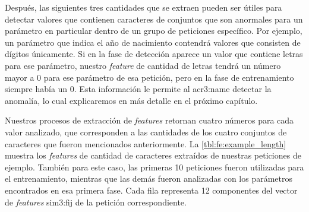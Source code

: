 Después, las siguientes tres cantidades que se extraen pueden ser útiles
para detectar valores que contienen caracteres de conjuntos que son
anormales para un parámetro en particular dentro de un grupo de peticiones
específico.
Por ejemplo, un parámetro que indica el año de nacimiento contendrá
valores que consisten de dígitos únicamente. Si en la fase de detección
aparece un valor que contiene letras para ese parámetro, nuestro
\textit{feature} de cantidad de letras tendrá un número mayor a 0 para
ese parámetro de esa petición, pero en la fase de entrenamiento siempre
había un 0. Esta información le permite al \gls{acr3:name} detectar la
anomalía, lo cual explicaremos en más detalle en el próximo capítulo.

Nuestros procesos de extracción de \textit{features} retornan cuatro
números para cada valor analizado, que corresponden a las cantidades de
los cuatro conjuntos de caracteres que fueron mencionados anteriormente.
La \autoref{tbl:fe:example_length} muestra los \textit{features} de
cantidad de caracteres extraídos de nuestras peticiones de ejemplo.
También para este caso, las primeras 10 peticiones fueron utilizadas
para el entrenamiento, mientras que las demás fueron analizadas con
los parámetros encontrados en esa primera fase. Cada fila representa
12 componentes del vector de \textit{features} \gls{sim3:fij} de la
petición correspondiente.

